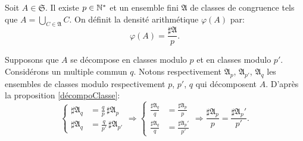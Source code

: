\begin{defi}
 Soit $A \in \mathfrak{S}$. Il existe $p \in \mathbb{N}^*$ et un ensemble fini $\mathfrak{A}$ de classes de congruence tels que $A = \bigcup_{C \in \mathfrak{A}}C$. On définit la densité arithmétique $\varphi(A)$ par:
 \begin{displaymath}
  \varphi(A) = \frac{\sharp \mathfrak{A}}{p}.
 \end{displaymath}
\end{defi}
\begin{demo}
Supposons que $A$ se décompose en classes modulo $p$ et en classes modulo $p'$. Considérons un multiple commun $q$. Notons respectivement $\mathfrak{A}_p$, $\mathfrak{A}_{p'}$, $\mathfrak{A}_q$ les ensembles de classes modulo respectivement $p$, $p'$, $q$ qui décomposent $A$. D'après la proposition \ref{décompoClasse}:
\begin{displaymath}
\left\lbrace
  \begin{aligned}
     \sharp \mathfrak{A}_q &= \frac{q}{p}  \, \sharp \mathfrak{A}_p \\
     \sharp \mathfrak{A}_q &= \frac{q}{p'} \, \sharp \mathfrak{A}_{p'}
  \end{aligned}
\right. \Rightarrow
\left\lbrace
 \begin{aligned}
    \frac{\sharp \mathfrak{A}_q}{q} &= \frac{\sharp \mathfrak{A}_p}{p} \\
    \frac{\sharp \mathfrak{A}_q}{q} &= \frac{\sharp \mathfrak{A}_p'}{p'}
 \end{aligned}
\right . \Rightarrow \frac{\sharp \mathfrak{A}_p}{p} = \frac{\sharp \mathfrak{A}_p'}{p'}.
\end{displaymath}
\end{demo}

